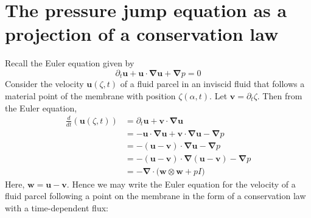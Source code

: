 \documentclass{article}[12pt]
\theoremstyle{Theorem}
\begin{document}
\section{The pressure jump equation as a projection of a conservation law}
\label{pressure jump derivation appendix}

Recall the Euler equation given by
\begin{equation}
    \partial_t\boldsymbol{u} + \boldsymbol{u}\cdot\boldsymbol{\nabla}\boldsymbol{u} + \boldsymbol{\nabla}p = 0
\end{equation}
Consider the velocity  $\boldsymbol{u}(\zeta,t)$ of a fluid parcel in an inviscid fluid that follows a material point of the membrane with position $\zeta(\alpha, t)$. Let $\boldsymbol{v} = \partial_t\zeta$. Then from the Euler equation,
\begin{align}
    \frac{d}{dt}(\boldsymbol{u}(\zeta,t)) &= \partial_t\boldsymbol{u} +\boldsymbol{v}\cdot\boldsymbol{\nabla}\boldsymbol{u} \\&= -\boldsymbol{u}\cdot\boldsymbol{\nabla}\boldsymbol{u} + \boldsymbol{v}\cdot\boldsymbol{\nabla}\boldsymbol{u} -\boldsymbol{\nabla}p \\
    &= -(\boldsymbol{u}- \boldsymbol{v})\cdot\boldsymbol{\nabla}\boldsymbol{u} - \boldsymbol{\nabla}p \\
    &=-(\boldsymbol{u}- \boldsymbol{v})\cdot\boldsymbol{\nabla}(\boldsymbol{u}-\boldsymbol v) - \boldsymbol{\nabla}p\\
    &= -\boldsymbol{\nabla}\cdot\big(\boldsymbol{w}\otimes\boldsymbol{w} + pI\big) 
\end{align}
Here, $\boldsymbol{w} =\boldsymbol{u} - \boldsymbol{v}$.
Hence we may write the Euler equation for the velocity of a fluid parcel following a point on the membrane in the form of a conservation law with a time-dependent flux:
\end{document}
